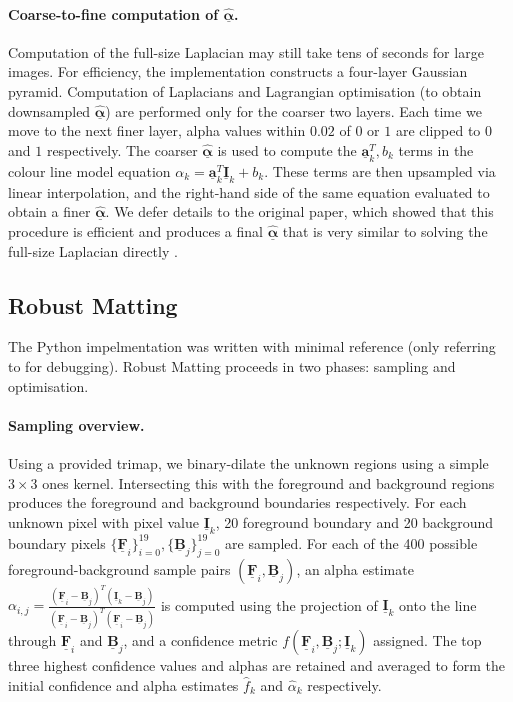 \documentclass{article}
\theoremstyle{definition}
\def\vt#1{\underline{\mathbf{#1}}}
\def\vts#1{\underline{\boldsymbol{#1}}}
\begin{document}
\begin{multicols}{2}[]
\paragraph{Coarse-to-fine computation of $\hat{\vts\alpha}$.} Computation of the full-size Laplacian may still take tens of seconds for large images. For efficiency, the implementation constructs a four-layer Gaussian pyramid. Computation of Laplacians and Lagrangian optimisation (to obtain downsampled $\hat{\vts\alpha}$) are performed only for the coarser two layers. Each time we move to the next finer layer, alpha values within $0.02$ of $0$ or $1$ are clipped to $0$ and $1$ respectively. The coarser $\hat{\vts\alpha}$ is used to compute the $\vt a_k^T, b_k$ terms in the colour line model equation $\alpha_k = \vt a_k^T \vt I_k + b_k$. These terms are then upsampled via linear interpolation, and the right-hand side of the same equation evaluated to obtain a finer $\hat{\vts\alpha}$. We defer details to the original paper, which showed that this procedure is efficient and produces a final $\hat{\vts\alpha}$ that is very similar to solving the full-size Laplacian directly \cite[\S4]{closed-form-matting}.





\subsection{Robust Matting}
The Python impelmentation was written with minimal reference (only referring to \cite{web:robust-cpp-github} for debugging). Robust Matting proceeds in two phases: sampling and optimisation.

\paragraph{Sampling overview.} Using a provided trimap, we binary-dilate the unknown regions using a simple $3\times 3$ ones kernel. Intersecting this with the foreground and background regions produces the foreground and background boundaries respectively. For each unknown pixel with pixel value $\vt I_k$, 20 foreground boundary and 20 background boundary pixels $\{\vt F_i\}_{i=0}^{19}, \{\vt B_j\}_{j=0}^{19}$ are sampled. For each of the 400 possible foreground-background sample pairs $(\vt F_i, \vt B_j)$, an alpha estimate $\alpha_{i,j} = \frac{\left(\vt F_i - \vt B_j\right)^T\left(\vt I_k - \vt B_j\right)}{\left(\vt F_i - \vt B_j\right)^T\left(\vt F_i - \vt B_j\right)}$ is computed using the projection of $\vt I_k$ onto the line through $\vt F_i$ and $\vt B_j$, and a confidence metric $f(\vt F_i, \vt B_j; \vt I_k)$ assigned. The top three highest confidence values and alphas are retained and averaged to form the initial confidence and alpha estimates $\hat f_k$ and $\hat{\alpha}_k$ respectively.


\end{multicols}
\end{document}
